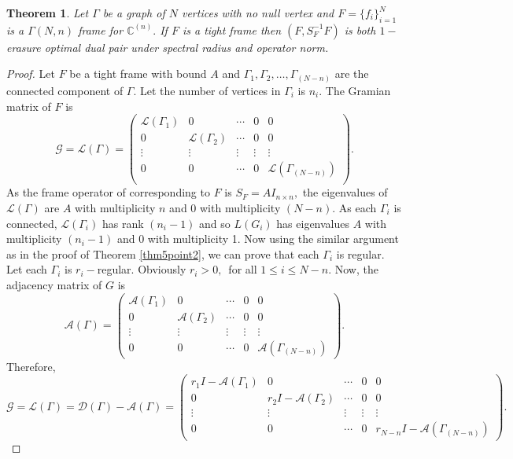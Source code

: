 \documentclass[final,1p,times]{elsarticle}
\newtheorem{thm}{Theorem}[section]
\begin{document}
\begin{thm}
	Let $\Gamma$ be a graph of $N$ vertices with no null vertex and $F= \{f_i\}_{i=1}^N$ is a $\Gamma(N,n)$ frame for $\mathbb{C}^{(n)}.$ If $F$ is a  tight frame then $\left( F, S_{F}^{-1}F \right) $ is both $1-$erasure optimal dual pair under spectral radius and operator norm. 
\end{thm}
\begin{proof}
	Let $F$ be a tight frame with bound $A$ and $\Gamma_1, \Gamma_2,\ldots, \Gamma_{(N-n)}$ are the connected component of $\Gamma.$ Let the number of vertices in $\Gamma_i$ is $n_i.$ The Gramian matrix of $F$ is $$\mathcal{G} = \mathcal{L}(\Gamma) = \begin{pmatrix}
		\mathcal{L}(\Gamma_1) & 0  & \cdots &0 &0\\
		0 & \mathcal{L}(\Gamma_2)  & \cdots &0 &0 \\
		\vdots &\vdots  &\vdots &\vdots &\vdots \\
		0 & 0  & \cdots &0 &  \mathcal{L}(\Gamma_{(N-n)}) \\
		
	\end{pmatrix}.$$ 
As the frame operator of corresponding to $F$ is $S_F = AI_{n\times n},$ the eigenvalues of $\mathcal{L}(\Gamma)$ are $A$ with multiplicity $n$ and $0$ with multiplicity $(N-n).$ As each $\Gamma_i$ is connected, $\mathcal{L}(\Gamma_i)$ has rank $(n_i -1)$ and so $L(G_i) $ has eigenvalues $A$ with multiplicity $(n_i -1)$ and  $0$ with multiplicity 1. Now using the similar argument as in the proof of Theorem  \ref{thm5point2}, we can prove that each $\Gamma_i$ is regular. Let each $\Gamma_i$ is $r_i -$regular. Obviously $r_i > 0,\,$ for all $1 \leq i \leq N-n.$ Now, the adjacency matrix of $G$ is $$\mathcal{A}(\Gamma) =  \begin{pmatrix}
	\mathcal{A}(\Gamma_1) & 0  & \cdots &0 &0\\
	0 & \mathcal{A}(\Gamma_2)  & \cdots &0 &0 \\
	\vdots &\vdots  &\vdots &\vdots &\vdots \\
	0 & 0  & \cdots &0 &  \mathcal{A}(\Gamma_{(N-n)})\end{pmatrix} .$$ 
	Therefore, 
	$$ \mathcal{G} = \mathcal{L}(\Gamma) = \mathcal{D}(\Gamma) - \mathcal{A}(\Gamma) = \begin{pmatrix}
		r_{1}I - \mathcal{A}(\Gamma_1) & 0  & \cdots &0 &0\\
		0 & r_{2}I - \mathcal{A}(\Gamma_2)  & \cdots &0 &0 \\
		\vdots &\vdots  &\vdots &\vdots &\vdots \\
		0 & 0  & \cdots &0 &  r_{N-n}I - \mathcal{A}(\Gamma_{(N-n)})\end{pmatrix} .$$
	

\end{proof}
\end{document}
